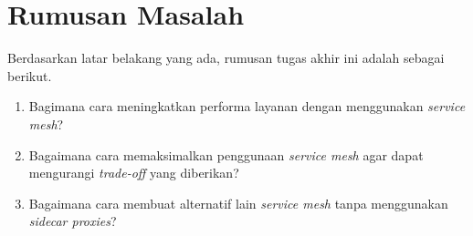 \section{Rumusan Masalah}

Berdasarkan latar belakang yang ada, rumusan tugas akhir ini adalah sebagai berikut.
\begin{enumerate}
    \item Bagimana cara meningkatkan performa layanan dengan menggunakan \textit{service mesh}?
    \item Bagaimana cara memaksimalkan penggunaan \textit{service mesh} agar dapat mengurangi \textit{trade-off} yang diberikan?
    \item Bagaimana cara membuat alternatif lain \textit{service mesh} tanpa menggunakan \textit{sidecar proxies}?
\end{enumerate}